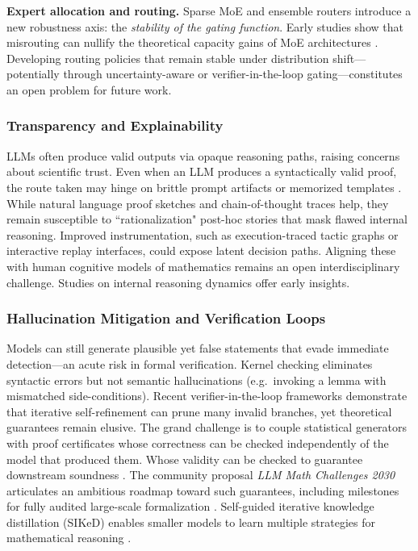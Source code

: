 \documentclass[acmsmall,anonymous]{acmart}
\begin{document}
\par\smallskip\noindent
\textbf{Expert allocation and routing.}  
Sparse MoE and ensemble routers introduce a new robustness axis: the
\emph{stability of the gating function}.  Early studies show that
misrouting can nullify the theoretical capacity gains of MoE
architectures \citep{chen2025symbolicmoe}.  Developing routing policies
that remain stable under distribution shift—potentially through
uncertainty-aware or verifier-in-the-loop gating—constitutes an open
problem for future work.

\subsubsection{Transparency and Explainability}\label{sec:explainfuture}
LLMs often produce valid outputs via opaque reasoning paths, raising concerns about scientific trust.  Even when an LLM produces a syntactically valid proof, the route taken may hinge on brittle prompt artifacts or memorized templates \cite{clark2021all}.  While natural language proof sketches \cite{welleck2022naturalprover} and chain-of-thought traces help, they remain susceptible to “rationalization" post-hoc stories that mask flawed internal reasoning.  Improved instrumentation, such as execution-traced tactic graphs or interactive replay interfaces, could expose latent decision paths.  Aligning these with human cognitive models of mathematics remains an open interdisciplinary challenge. Studies on internal reasoning dynamics \cite{anonymous2025whoreasons} offer early insights.

\subsubsection{Hallucination Mitigation and Verification Loops}\label{sec:hallucinationfuture}
Models can still generate plausible yet false statements that evade immediate detection—an acute risk in formal verification.  Kernel checking eliminates syntactic errors but not semantic hallucinations (e.g.\ invoking a lemma with mismatched side-conditions).  Recent verifier-in-the-loop frameworks demonstrate that iterative self-refinement can prune many invalid branches, yet theoretical guarantees remain elusive.  The grand challenge is to couple statistical generators with proof certificates whose correctness can be checked independently of the model that produced them. Whose validity can be checked to guarantee downstream soundness \cite{romera2024mathematical}. The community proposal \emph{LLM Math Challenges 2030} articulates an ambitious roadmap toward such guarantees, including milestones for fully audited large-scale formalization \cite{ahn2024largelanguagemodels}. Self-guided iterative knowledge distillation (SIKeD) enables smaller models to learn multiple strategies for mathematical reasoning \cite{adarsh2024siked}.
\end{document}
